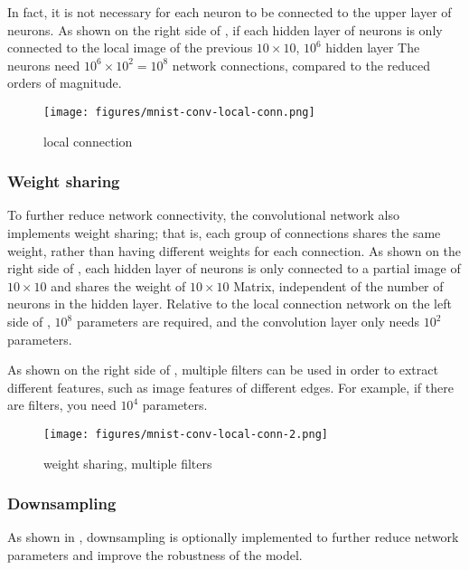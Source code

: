\begin{content}
\begin{content}
In fact, it is not necessary for each neuron to be connected to the upper layer of neurons. As shown on the right side of , if each hidden layer of neurons is only connected to the local image of the previous $10\times 10 $, $10^6 $ hidden layer The neurons need $10^6\times 10^2 = 10^8$ network connections, compared to the reduced  orders of magnitude.

\begin{figure}[H]
  \centering
  \texttt{[image: figures/mnist-conv-local-conn.png]}
  \caption{local connection}
  \label{fig:mnist-conv-local-conn}
\end{figure}


\subsubsection{Weight sharing}
To further reduce network connectivity, the convolutional network also implements weight sharing; that is, each group of connections shares the same weight, rather than having different weights for each connection. As shown on the right side of , each hidden layer of neurons is only connected to a partial image of $10\times 10 $ and shares the weight of $ 10 \times 10 $ Matrix, independent of the number of neurons in the hidden layer. Relative to the local connection network on the left side of , $10^8$ parameters are required, and the convolution layer only needs $10^2$ parameters.

As shown on the right side of , multiple filters can be used in order to extract different features, such as image features of different edges. For example, if there are  filters, you need $10^4$ parameters.

\begin{figure}[H]
  \centering
  \texttt{[image: figures/mnist-conv-local-conn-2.png]}
  \caption{weight sharing, multiple filters}
  \label{fig:mnist-conv-local-conn-2}
\end{figure}


\subsubsection{Downsampling}
As shown in , downsampling is optionally implemented to further reduce network parameters and improve the robustness of the model.


\end{content}
\end{content}
